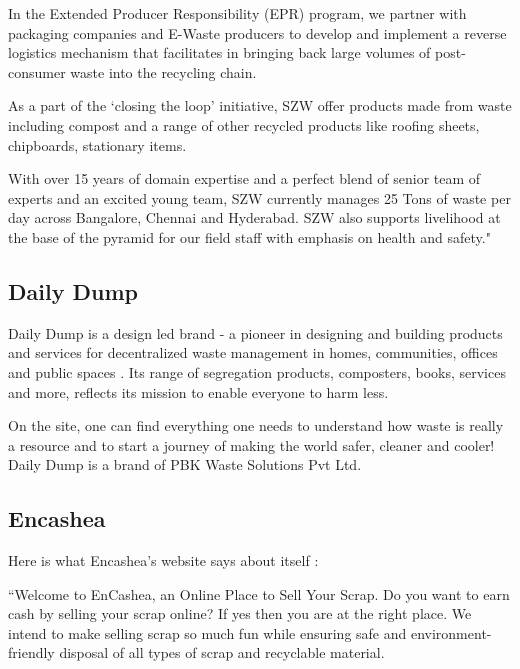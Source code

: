 \documentclass[10pt]{article}
\begin{document}
In the Extended Producer Responsibility (EPR) program, we partner with packaging companies and E-Waste producers to develop and implement a reverse logistics mechanism that facilitates in bringing back large volumes of post-consumer waste into the recycling chain.

As a part of the ‘closing the loop’ initiative, SZW offer products made from waste including compost and a range of other recycled products like roofing sheets, chipboards, stationary items.

With over 15 years of domain expertise and a perfect blend of senior team of experts and an excited young team, SZW currently manages 25 Tons of waste per day across Bangalore, Chennai and Hyderabad. SZW also supports livelihood at the base of the pyramid for our field staff with emphasis on health and safety."

\subsection{Daily Dump}

Daily Dump is a design led brand - a pioneer in designing and building products and services for decentralized waste management in homes, communities, offices and public spaces \citep{DailyDump:about}. Its range of segregation products, composters, books, services and more, reflects its mission to enable everyone to harm less.

On the site, one can find everything one needs to understand how waste is really a resource and to start a journey of making the world safer, cleaner and cooler! 
Daily Dump is a brand of PBK Waste Solutions Pvt Ltd.

\subsection{Encashea}

Here is what Encashea's website says about itself \citep{Encashea:about}:

``Welcome to EnCashea, an Online Place to Sell Your Scrap. Do you want to earn cash by selling your scrap online? If yes then you are at the right place. We intend to make selling scrap so much fun while ensuring safe and environment-friendly disposal of all types of scrap and recyclable material.
\end{document}
